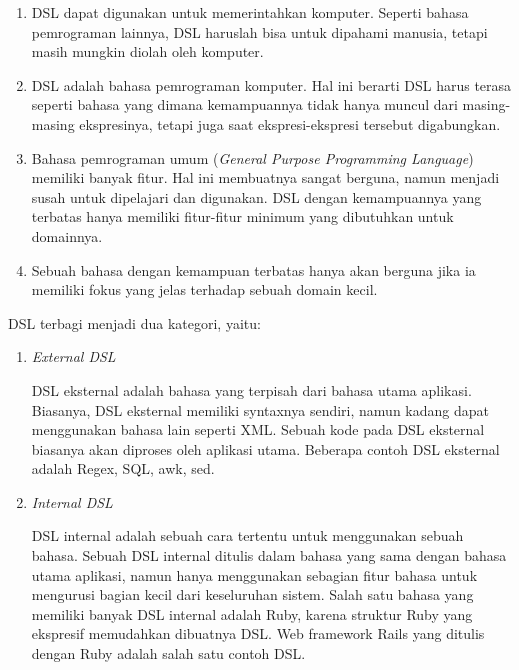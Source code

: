 \begin{enumerate}
  \item DSL dapat digunakan untuk memerintahkan komputer. Seperti bahasa pemrograman lainnya,
        DSL haruslah bisa untuk dipahami manusia, tetapi masih mungkin diolah oleh komputer.

  \item DSL adalah bahasa pemrograman komputer. Hal ini berarti DSL harus terasa seperti
        bahasa yang dimana kemampuannya tidak hanya muncul dari masing-masing ekspresinya,
        tetapi juga saat ekspresi-ekspresi tersebut digabungkan.

  \item Bahasa pemrograman umum (\emph{General Purpose Programming Language}) memiliki banyak fitur.
        Hal ini membuatnya sangat berguna, namun menjadi susah untuk dipelajari dan digunakan.
        DSL dengan kemampuannya yang terbatas hanya memiliki fitur-fitur minimum yang dibutuhkan untuk domainnya.

  \item Sebuah bahasa dengan kemampuan terbatas hanya akan berguna jika ia memiliki
        fokus yang jelas terhadap sebuah domain kecil.
\end{enumerate}

DSL terbagi menjadi dua kategori, yaitu:

\begin{enumerate}
  \item \emph{External DSL}

        DSL eksternal adalah bahasa yang terpisah dari bahasa utama aplikasi.
        Biasanya, DSL eksternal memiliki syntaxnya sendiri, namun kadang dapat menggunakan
        bahasa lain seperti XML. Sebuah kode pada DSL eksternal biasanya akan diproses oleh
        aplikasi utama. Beberapa contoh DSL eksternal adalah Regex, SQL, awk, sed.

  \item \emph{Internal DSL}

        DSL internal adalah sebuah cara tertentu untuk menggunakan sebuah bahasa.
        Sebuah DSL internal ditulis dalam bahasa yang sama dengan bahasa utama aplikasi,
        namun hanya menggunakan sebagian fitur bahasa untuk mengurusi bagian kecil
        dari keseluruhan sistem. Salah satu bahasa yang memiliki banyak DSL internal adalah Ruby,
        karena struktur Ruby yang ekspresif memudahkan dibuatnya DSL.
        Web framework Rails yang ditulis dengan Ruby adalah salah satu contoh DSL.
\end{enumerate}

